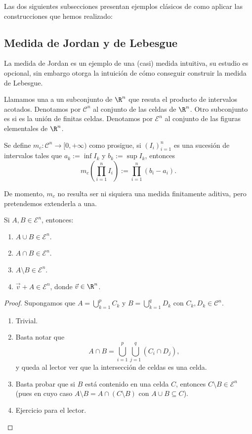 Las dos siguientes subsecciones presentan ejemplos clásicos de como aplicar las construcciones que hemos realizado:

\subsection{Medida de Jordan y de Lebesgue}
La medida de Jordan es un ejemplo de una (casi) medida intuitiva, su estudio es opcional, sin embargo otorga la intuición de cómo conseguir construir la medida de Lebesgue.

\begin{mydefi}
	Llamamos una  a un subconjunto de $\R^n$ que resuta el producto de intervalos acotados. Denotamos por $\mathcal{C}^n$ al conjunto de las celdas de $\R^n$.
	Otro subconjunto es  si es la unión de finitas celdas. Denotamos por $\mathcal{E}^n$ al conjunto de las figuras elementales de $\R^n$.
	\par
	Se define $m_c: \mathcal{C}^n \to [0,+\infty)$ como prosigue, si $(I_i)_{i=1}^n$ es una sucesión de intervalos tales que $a_k := \inf I_k$ y $b_k := \sup I_k$, entonces
	$$ m_c\left( \prod_{i=1}^n I_i \right) := \prod_{i=1}^n (b_i - a_i). $$
\end{mydefi}
De momento, $m_c$ no resulta ser ni siquiera una medida finitamente aditiva, pero pretendemos extenderla a una.

\begin{prop}
	Si $A,B \in \mathcal{E}^n$, entonces:
	\begin{enumerate}
		\item $A\cup B\in\mathcal{E}^n$.
		\item $A\cap B\in\mathcal{E}^n$.
		\item $A\setminus B\in\mathcal{E}^n$.
		\item $\vec v+A\in\mathcal{E}^n$, donde $\vec v\in\R^n$.
	\end{enumerate}
\end{prop}
\begin{proof}
	Supongamos que $A = \bigcup_{k=1}^p C_k$ y $B = \bigcup_{k=1}^q D_k$ con $C_k,D_k\in \mathcal{C}^n$.
	\begin{enumerate}
		\item Trivial.
		\item Basta notar que
			$$ A\cap B = \bigcup_{i=1}^p\bigcup_{j=1}^q(C_i\cap D_j), $$
			y queda al lector ver que la intersección de celdas es una celda.
		\item Basta probar que si $B$ está contenido en una celda $C$, entonces $C\setminus B \in \mathcal{E}^n$ (pues en cuyo caso $A\setminus B = A\cap(C\setminus B)$ con $A\cup B\subseteq C$).
		\item Ejercicio para el lector. \qedhere
	\end{enumerate}
\end{proof}

